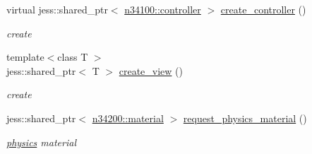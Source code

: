 \begin{DoxyCompactItemize}
virtual jess::shared\_\-ptr$<$ \hyperlink{classnebula_1_1content_1_1actor_1_1admin_1_1controller}{n34100::controller} $>$ \hyperlink{classnebula_1_1content_1_1scene_1_1admin_1_1base_a5e393e9d882c4d59f67e8ae3be02fd2f}{create\_\-controller} ()
\begin{DoxyCompactList}\small\item\em create \item\end{DoxyCompactList}\item 
{\footnotesize template$<$class T $>$ }\\jess::shared\_\-ptr$<$ T $>$ \hyperlink{classnebula_1_1content_1_1scene_1_1admin_1_1base_a702113c4d98aa72428fca6946c14bc77}{create\_\-view} ()
\begin{DoxyCompactList}\small\item\em create \item\end{DoxyCompactList}\item 
jess::shared\_\-ptr$<$ \hyperlink{classnebula_1_1content_1_1actor_1_1physics_1_1material}{n34200::material} $>$ \hyperlink{classnebula_1_1content_1_1scene_1_1admin_1_1base_a48f3df157de95521f0a0045a3b995c7c}{request\_\-physics\_\-material} ()
\begin{DoxyCompactList}\small\item\em \hyperlink{namespacenebula_1_1content_1_1scene_1_1physics}{physics} material \item\end{DoxyCompactList}\end{DoxyCompactItemize}
